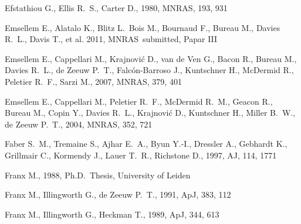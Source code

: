 \documentclass[usenatbib,usegraphicx]{mn2e}
\def\aj{AJ}             %
\def\apj{ApJ}           %
\def\mnras{MNRAS}       %
\begin{document}
\begin{thebibliography}{}
{Efstathiou} G.,  {Ellis} R.~S.,    {Carter} D.,  1980, \mnras, 193, 931

{Emsellem} E.,  {Alatalo} K.,  {Blitz} L.~{Bois} M.,  {Bournaud} F.,  {Bureau}
  M.,  {Davies} R.~L.,  {Davis} T.,    {et al.} 2011, \mnras~submitted, Papar
  III

{Emsellem} E.,  {Cappellari} M.,  {Krajnovi{\'c}} D.,  {van de Ven} G.,
  {Bacon} R.,  {Bureau} M.,  {Davies} R.~L.,  {de Zeeuw} P.~T.,
  {Falc{\'o}n-Barroso} J.,  {Kuntschner} H.,  {McDermid} R.,  {Peletier} R.~F.,
     {Sarzi} M.,  2007, \mnras, 379, 401

{Emsellem} E.,  {Cappellari} M.,  {Peletier} R.~F.,  {McDermid} R.~M.,
  {Geacon} R.,  {Bureau} M.,  {Copin} Y.,  {Davies} R.~L.,  {Krajnovi{\' c}}
  D.,  {Kuntschner} H.,  {Miller} B.~W.,    {de Zeeuw} P.~T.,  2004, \mnras,
  352, 721

{Faber} S.~M.,  {Tremaine} S.,  {Ajhar} E.~A.,  {Byun} Y.-I.,  {Dressler} A.,
  {Gebhardt} K.,  {Grillmair} C.,  {Kormendy} J.,  {Lauer} T.~R.,
  {Richstone} D.,  1997, \aj, 114, 1771

{Franx} M.,  1988, Ph.D.~Thesis, University of Leiden

{Franx} M.,  {Illingworth} G.,    {de Zeeuw} P.~T.,  1991, \apj, 383, 112

{Franx} M.,  {Illingworth} G.,    {Heckman} T.,  1989, \apj, 344, 613


\end{thebibliography}
\end{document}

